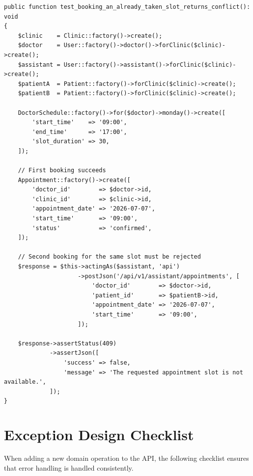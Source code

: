 \begin{lstlisting}[style=php, caption={Feature test asserting the conflict
  response for a double-booking attempt.}]
public function test_booking_an_already_taken_slot_returns_conflict(): void
{
    $clinic    = Clinic::factory()->create();
    $doctor    = User::factory()->doctor()->forClinic($clinic)->create();
    $assistant = User::factory()->assistant()->forClinic($clinic)->create();
    $patientA  = Patient::factory()->forClinic($clinic)->create();
    $patientB  = Patient::factory()->forClinic($clinic)->create();

    DoctorSchedule::factory()->for($doctor)->monday()->create([
        'start_time'    => '09:00',
        'end_time'      => '17:00',
        'slot_duration' => 30,
    ]);

    // First booking succeeds
    Appointment::factory()->create([
        'doctor_id'        => $doctor->id,
        'clinic_id'        => $clinic->id,
        'appointment_date' => '2026-07-07',
        'start_time'       => '09:00',
        'status'           => 'confirmed',
    ]);

    // Second booking for the same slot must be rejected
    $response = $this->actingAs($assistant, 'api')
                     ->postJson('/api/v1/assistant/appointments', [
                         'doctor_id'        => $doctor->id,
                         'patient_id'       => $patientB->id,
                         'appointment_date' => '2026-07-07',
                         'start_time'       => '09:00',
                     ]);

    $response->assertStatus(409)
             ->assertJson([
                 'success' => false,
                 'message' => 'The requested appointment slot is not available.',
             ]);
}
\end{lstlisting}

\section{Exception Design Checklist}
\label{sec:exception-checklist}

When adding a new domain operation to the API, the following checklist
ensures that error handling is handled consistently.

